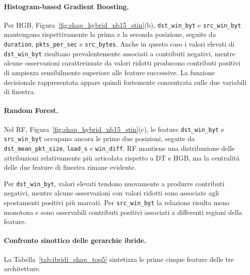 \paragraph{Histogram-based Gradient Boosting.}
Per HGB, Figura~\ref{fig:shap_hybrid_nb15_stin}(b), \texttt{dst\_win\_byt} e \texttt{src\_win\_byt} mantengono rispettivamente la prima e la seconda posizione, seguite da \texttt{duration}, \texttt{pkts\_per\_sec} e \texttt{src\_bytes}. 
Anche in questo caso i valori elevati di \texttt{dst\_win\_byt} risultano prevalentemente associati a contributi negativi, mentre alcune osservazioni caratterizzate da valori ridotti producono contributi positivi di ampiezza sensibilmente superiore alle feature successive. 
La funzione decisionale rappresentata appare quindi fortemente concentrata sulle due variabili di finestra.

\paragraph{Random Forest.}
Nel RF, Figura~\ref{fig:shap_hybrid_nb15_stin}(c), le feature \texttt{dst\_win\_byt} e \texttt{src\_win\_byt} occupano ancora le prime due posizioni, seguite da \texttt{dst\_mean\_pkt\_size}, \texttt{load\_s} e \texttt{win\_diff}. 
RF mantiene una distribuzione delle attribuzioni relativamente più articolata rispetto a DT e HGB, ma la centralità delle due feature di finestra rimane evidente.

Per \texttt{dst\_win\_byt}, valori elevati tendono nuovamente a produrre contributi negativi, mentre alcune osservazioni con valori ridotti sono associate agli spostamenti positivi più marcati. 
Per \texttt{src\_win\_byt} la relazione risulta meno monotona e sono osservabili contributi positivi associati a differenti regioni della feature.

\paragraph{Confronto sinottico delle gerarchie ibride.}
La Tabella~\ref{tab:ibridi_shap_top5} sintetizza le prime cinque feature delle tre architetture.

